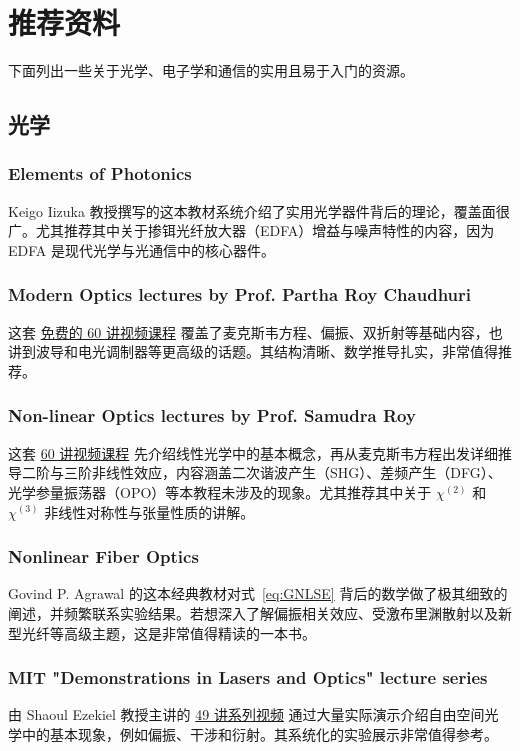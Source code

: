 \chapter{推荐资料}
\label{ch:material}
下面列出一些关于光学、电子学和通信的实用且易于入门的资源。

\section{光学}

\subsection*{Elements of Photonics}
Keigo Iizuka 教授撰写的这本教材系统介绍了实用光学器件背后的理论，覆盖面很广。尤其推荐其中关于掺铒光纤放大器（EDFA）增益与噪声特性的内容，因为 EDFA 是现代光学与光通信中的核心器件。


\subsection*{Modern Optics lectures by Prof. Partha Roy Chaudhuri}
这套 \href{https://www.youtube.com/watch?v=2WiMeh1Dxl8&list=PLbRMhDVUMngePMuAGeAUeGVuZffTFY-5i}{免费的 60 讲视频课程} 覆盖了麦克斯韦方程、偏振、双折射等基础内容，也讲到波导和电光调制器等更高级的话题。其结构清晰、数学推导扎实，非常值得推荐。

\subsection*{Non-linear Optics lectures by Prof. Samudra Roy}
这套 \href{https://www.youtube.com/watch?v=EiIDScj124Q&list=PLbRMhDVUMngfBwyonVP8VIsabtnsV3GVv}{60 讲视频课程} 先介绍线性光学中的基本概念，再从麦克斯韦方程出发详细推导二阶与三阶非线性效应，内容涵盖二次谐波产生（SHG）、差频产生（DFG）、光学参量振荡器（OPO）等本教程未涉及的现象。尤其推荐其中关于 $\chi^{(2)}$ 和 $\chi^{(3)}$ 非线性对称性与张量性质的讲解。

\subsection*{Nonlinear Fiber Optics}
Govind P. Agrawal 的这本经典教材对式~\ref{eq:GNLSE} 背后的数学做了极其细致的阐述，并频繁联系实验结果。若想深入了解偏振相关效应、受激布里渊散射以及新型光纤等高级主题，这是非常值得精读的一本书。

\subsection*{MIT "Demonstrations in Lasers and Optics" lecture series}
由 Shaoul Ezekiel 教授主讲的 \href{https://www.youtube.com/watch?v=1cEXNLP5uE0&list=PL4E7FAAD67B171EBC}{49 讲系列视频} 通过大量实际演示介绍自由空间光学中的基本现象，例如偏振、干涉和衍射。其系统化的实验展示非常值得参考。

